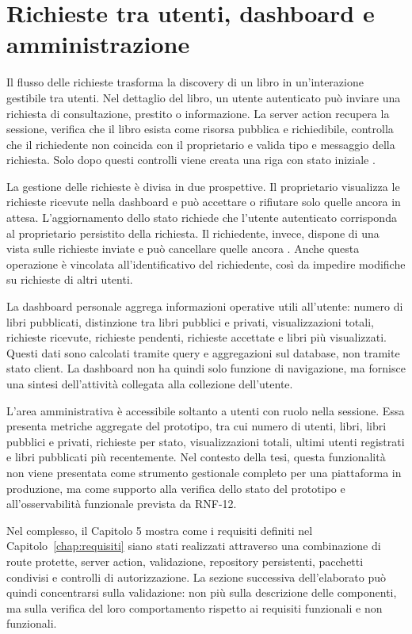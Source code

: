 \section{Richieste tra utenti, dashboard e amministrazione}
\label{sec:implementazione-richieste-dashboard}

Il flusso delle richieste trasforma la discovery di un libro in un'interazione gestibile tra utenti. Nel dettaglio del libro, un utente autenticato può inviare una richiesta di consultazione, prestito o informazione. La server action recupera la sessione, verifica che il libro esista come risorsa pubblica e richiedibile, controlla che il richiedente non coincida con il proprietario e valida tipo e messaggio della richiesta. Solo dopo questi controlli viene creata una riga  con stato iniziale .

La gestione delle richieste è divisa in due prospettive. Il proprietario visualizza le richieste ricevute nella dashboard e può accettare o rifiutare solo quelle ancora in attesa. L'aggiornamento dello stato richiede che l'utente autenticato corrisponda al proprietario persistito della richiesta. Il richiedente, invece, dispone di una vista sulle richieste inviate e può cancellare quelle ancora . Anche questa operazione è vincolata all'identificativo del richiedente, così da impedire modifiche su richieste di altri utenti.

La dashboard personale aggrega informazioni operative utili all'utente: numero di libri pubblicati, distinzione tra libri pubblici e privati, visualizzazioni totali, richieste ricevute, richieste pendenti, richieste accettate e libri più visualizzati. Questi dati sono calcolati tramite query e aggregazioni sul database, non tramite stato client. La dashboard non ha quindi solo funzione di navigazione, ma fornisce una sintesi dell'attività collegata alla collezione dell'utente.

L'area amministrativa è accessibile soltanto a utenti con ruolo  nella sessione. Essa presenta metriche aggregate del prototipo, tra cui numero di utenti, libri, libri pubblici e privati, richieste per stato, visualizzazioni totali, ultimi utenti registrati e libri pubblicati più recentemente. Nel contesto della tesi, questa funzionalità non viene presentata come strumento gestionale completo per una piattaforma in produzione, ma come supporto alla verifica dello stato del prototipo e all'osservabilità funzionale prevista da RNF-12.

Nel complesso, il Capitolo 5 mostra come i requisiti definiti nel Capitolo~\ref{chap:requisiti} siano stati realizzati attraverso una combinazione di route protette, server action, validazione, repository persistenti, pacchetti condivisi e controlli di autorizzazione. La sezione successiva dell'elaborato può quindi concentrarsi sulla validazione: non più sulla descrizione delle componenti, ma sulla verifica del loro comportamento rispetto ai requisiti funzionali e non funzionali.
